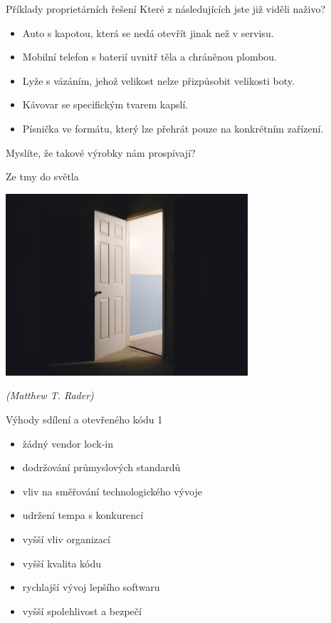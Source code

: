 \documentclass[11pt]{beamer}
\begin{document}
\begin{frame}{Příklady proprietárních řešení}
	Které z následujících jste již viděli naživo?
\begin{itemize}
	\item Auto s kapotou, která se nedá otevřít jinak než v servisu.
	\item Mobilní telefon s baterií uvnitř těla a chráněnou plombou.
	\item Lyže s vázáním, jehož velikost nelze přizpůsobit velikosti boty.
	\item Kávovar se specifickým tvarem kapslí.
	\item Písnička ve formátu, který lze přehrát pouze na konkrétním zařízení.
\end{itemize}
Myslíte, že takové výrobky nám prospívají?
\end{frame}

	\begin{frame}{Ze tmy do světla}
	\begin{center}
		\includegraphics[width=9cm]{images/opened.jpg}
	\end{center}
	\begin{flushright}
		\textit{(Matthew T. Rader)}
	\end{flushright}
	\end{frame}

\begin{frame}{Výhody sdílení a otevřeného kódu 1}
	\begin{itemize}
		\item žádný vendor lock-in
		\item dodržování průmyslových standardů
		\item vliv na směřování technologického vývoje
		\item udržení tempa s konkurencí
		\item vyšší vliv organizací
		\item vyšší kvalita kódu
		\item rychlajší vývoj lepšího softwaru
		\item vyšší spolehlivost a bezpečí
	\end{itemize}
\end{frame}
\end{document}
